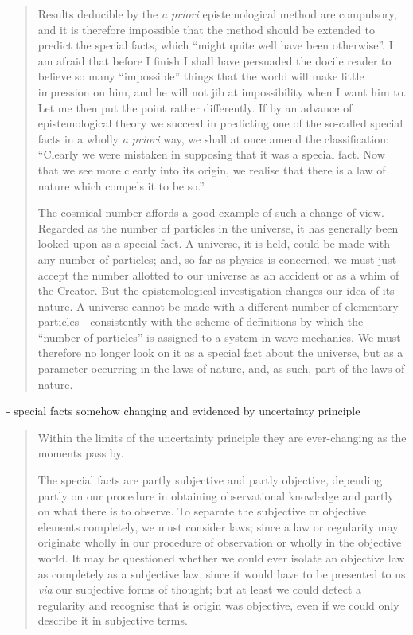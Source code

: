 \begin{quote}
    Results deducible by the \emph{a priori} epistemological method are compulsory, and it is therefore impossible that the method should be extended to predict the special facts, which ``might quite well have been otherwise''.  I am afraid that before I finish I shall have persuaded the docile reader to believe so many ``impossible'' things that the world will make little impression on him, and he will not jib at impossibility when I want him to.  Let me then put the point rather differently.  If by an advance of epistemological theory we succeed in predicting one of the so-called special facts in a wholly \emph{a priori} way, we shall at once amend the classification: ``Clearly we were mistaken in supposing that it was a special fact.  Now that we see more clearly into its origin, we realise that there is a law of nature which compels it to be so.''
    
    The cosmical number affords a good example of such a change of view.  Regarded as the number of particles in the universe, it has generally been looked upon as a special fact.  A universe, it is held, could be made with any number of particles; and, so far as physics is concerned, we must just accept the number allotted to our universe as an accident or as a whim of the Creator.  But the epistemological investigation changes our idea of its nature.  A universe cannot be made with a different number of elementary particles---consistently with the scheme of definitions by which the ``number of particles'' is assigned to a system in wave-mechanics.  We must therefore no longer look on it as a special fact about the universe, but as a parameter occurring in the laws of nature, and, as such, part of the laws of nature.
    
    \citep[p. 63-65]{Eddington1939}
\end{quote}

- special facts somehow changing and evidenced by uncertainty principle

\begin{quote}
    Within the limits of the uncertainty principle they are ever-changing as the moments pass by.
    
    The special facts are partly subjective and partly objective, depending partly on our procedure in obtaining observational knowledge and partly on what there is to observe.  To separate the subjective or objective elements completely, we must consider laws; since a law or regularity may originate wholly in our procedure of observation or wholly in the objective world.  It may be questioned whether we could ever isolate an objective law as completely as a subjective law, since it would have to be presented to us \emph{via} our subjective forms of thought; but at least we could detect a regularity and recognise that is origin was objective, even if we could only describe it in subjective terms.
    
    
    
    \citep[p. 66]{Eddington1939}
\end{quote}

